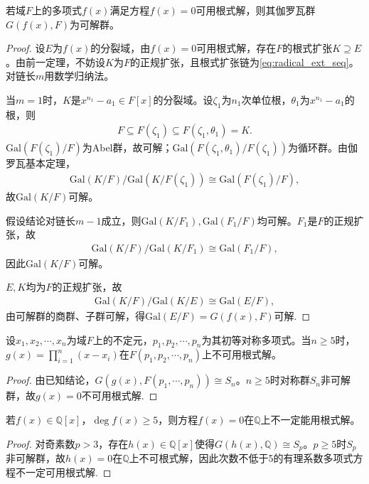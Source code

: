 \documentclass[../../main.tex]{subfiles}%
\begin{document}
\begin{theorem}
若域$F$上的多项式$f(x)$满足方程$f(x)=0$可用根式解，则其伽罗瓦群$G(f(x),F)$为可解群。
\end{theorem}
\begin{proof}
设$E$为$f(x)$的分裂域，由$f(x)=0$可用根式解，存在$F$的根式扩张$K\supseteq E$。由前一定理，不妨设$K$为$F$的正规扩张，且根式扩张链为\eqref{eq:radical_ext_seq}。对链长$m$用数学归纳法。

当$m=1$时，$K$是$x^{n_1}-a_1\in F[x]$的分裂域。设$\zeta_1$为$n_1$次单位根，$\theta_1$为$x^{n_1}-a_1$的根，则
\begin{align*}
F\subseteq F(\zeta_1)\subseteq F(\zeta_1,\theta_1)=K.
\end{align*}
$\mathrm{Gal}(F(\zeta_1)/F)$为Abel群，故可解；$\mathrm{Gal}(F(\zeta_1,\theta_1)/F(\zeta_1))$为循环群。由伽罗瓦基本定理，
\begin{align*}
\mathrm{Gal}(K/F)/\mathrm{Gal}(K/F(\zeta_1))\cong\mathrm{Gal}(F(\zeta_1)/F),
\end{align*}
故$\mathrm{Gal}(K/F)$可解。

假设结论对链长$m-1$成立，则$\mathrm{Gal}(K/F_1),\mathrm{Gal}(F_1/F)$均可解。$F_1$是$F$的正规扩张，故
\begin{align*}
\mathrm{Gal}(K/F)/\mathrm{Gal}(K/F_1)\cong\mathrm{Gal}(F_1/F),
\end{align*}
因此$\mathrm{Gal}(K/F)$可解。

$E,K$均为$F$的正规扩张，故
\begin{align*}
\mathrm{Gal}(K/F)/\mathrm{Gal}(K/E)\cong\mathrm{Gal}(E/F),
\end{align*}
由可解群的商群、子群可解，得$\mathrm{Gal}(E/F)=G(f(x),F)$可解.
\end{proof}

\begin{corollary}
设$x_1,x_2,\cdots,x_n$为域$F$上的不定元，$p_1,p_2,\cdots,p_n$为其初等对称多项式。当$n\geqslant5$时，$g(x)=\prod\limits_{i=1}^n(x-x_i)$在$F(p_1,p_2,\cdots,p_n)$上不可用根式解。
\end{corollary}
\begin{proof}
由已知结论，$G(g(x),F(p_1,\cdots,p_n))\cong S_n$。$n\geqslant5$时对称群$S_n$非可解群，故$g(x)=0$不可用根式解.
\end{proof}

\begin{corollary}
若$f(x)\in\mathbb{Q}[x]$，$\deg f(x)\geqslant5$，则方程$f(x)=0$在$\mathbb{Q}$上不一定能用根式解。
\end{corollary}
\begin{proof}
对奇素数$p>3$，存在$h(x)\in\mathbb{Q}[x]$使得$G(h(x),\mathbb{Q})\cong S_p$。$p\geqslant5$时$S_p$非可解群，故$h(x)=0$在$\mathbb{Q}$上不可根式解，因此次数不低于5的有理系数多项式方程不一定可用根式解.
\end{proof}
\end{document}
